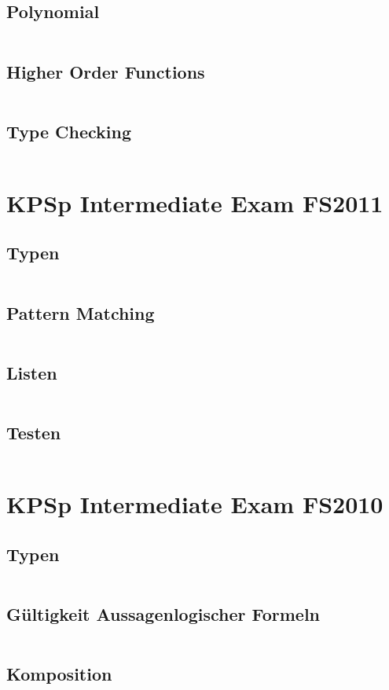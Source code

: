 \documentclass[a4paper,9pt,twoside]{book}
\newcommand{\hsfile}[1]{\inputminted[breaklines]{haskell}{../haskell/#1.hs}}
\begin{document}
\section{Polynomial}
\hsfile{exam2010/problem_2}
\section{Higher Order Functions}
\hsfile{exam2010/problem_3}
\section{Type Checking}
\hsfile{exam2010/problem_4}

\chapter{KPSp Intermediate Exam FS2011}
\section{Typen}
\hsfile{exam2011/problem_1}
\section{Pattern Matching}
\hsfile{exam2011/problem_2}
\section{Listen}
\hsfile{exam2011/problem_3}
\section{Testen}
\hsfile{exam2011/problem_4}

\chapter{KPSp Intermediate Exam FS2010}
\section{Typen}
\hsfile{exami2010/problem_1}
\section{Gültigkeit Aussagenlogischer Formeln}
\hsfile{exami2010/problem_2}
\section{Komposition}
\hsfile{exami2010/problem_3}
\end{document}
